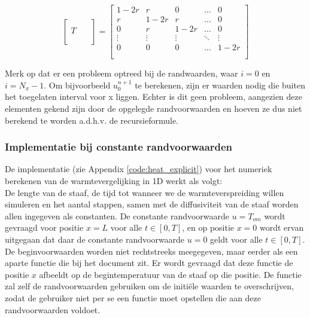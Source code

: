 \documentclass[a4paper,kulak]{kulakarticle} %
\begin{document}
\begin{equation}
	\begin{bmatrix}
		\qquad \\
		T \\
		\\ 
	\end{bmatrix}
	=
	\begin{bmatrix}
		1-2r	&	r		&	0		&	\dots	&	0 		\\
		r		&	1-2r	&	r		&	\dots	&	0		\\
		0		&	r		&	1-2r	&	\dots	&	0		\\
		\vdots	&	\vdots	&	\vdots	&	\ddots	&	\vdots	\\
		0		&	0		&	0		&	\dots	&	1-2r	\\
		\\ 
	\end{bmatrix}
\end{equation}

Merk op dat er een probleem optreed bij de randwaarden, waar $i = 0$ en $i = N_x-1$. Om bijvoorbeeld $u_0^{n+1}$ te berekenen, zijn er waarden nodig die buiten het toegelaten interval voor x liggen. Echter is dit geen probleem, aangezien deze elementen gekend zijn door de opgelegde randvoorwaarden en hoeven ze dus niet berekend te worden a.d.h.v. de recursieformule.

\subsubsection{Implementatie bij constante randvoorwaarden}
\label{sec:impl_expl_constant}

De implementatie  (zie Appendix \ref{code:heat_explicit}) voor het numeriek berekenen van de warmtevergelijking in 1D werkt als volgt: \\
De lengte van de staaf, de tijd tot wanneer we de warmteverspreiding willen simuleren en het aantal stappen, samen met de diffusiviteit van de staaf worden allen ingegeven als constanten. De constante randvoorwaarde $u = T_{om}$ wordt gevraagd voor positie $x = L$ voor alle $t \in [0, T]$, en op positie $x = 0$ wordt ervan uitgegaan dat daar de constante randvoorwaarde $u = 0$ geldt voor alle $t \in [0, T]$. De beginvoorwaarden worden niet rechtstreeks meegegeven, maar eerder als een aparte functie  die bij het document zit. Er wordt gevraagd dat deze functie de positie $x$ afbeeldt op de begintemperatuur van de staaf op die positie. De functie  zal zelf de randvoorwaarden gebruiken om de initiële waarden te overschrijven, zodat de gebruiker niet per se een functie moet opstellen die aan deze randvoorwaarden voldoet.
\end{document}
